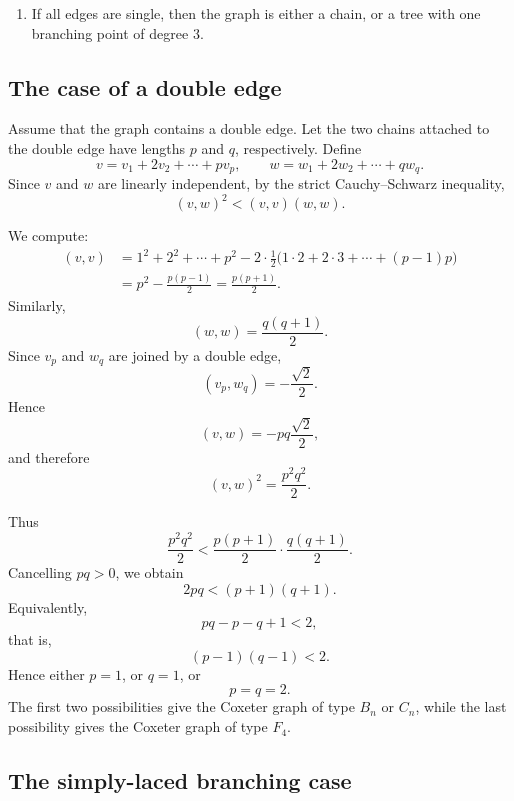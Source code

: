 \begin{enumerate}
\[\begin{tikzpicture}[coxeter]
                  \node at (v1) [below=4pt] {\(v_1\)};
                  \node at (v2) [below=4pt] {\(v_2\)};
                  \node at (vp) [below=4pt] {\(v_p\)};
                  \node at (wq) [below=4pt] {\(w_q\)};
                  \node at (w2) [below=4pt] {\(w_2\)};
                  \node at (w1) [below=4pt] {\(w_1\)};
              \end{tikzpicture}
          \]

    \item If all edges are single, then the graph is either a chain, or a
          tree with one branching point of degree \(3\).
\end{enumerate}

\subsection{The case of a double edge}

Assume that the graph contains a double edge. Let the two chains attached
to the double edge have lengths \(p\) and \(q\), respectively. Define
\[
    v=v_1+2v_2+\cdots+p v_p,
    \qquad
    w=w_1+2w_2+\cdots+q w_q.
\]
Since \(v\) and \(w\) are linearly independent, by the strict Cauchy--Schwarz
inequality,
\[
    (v,w)^2 < (v,v)(w,w).
\]

We compute:
\[
    \begin{aligned}
        (v,v)
         & =
        1^2+2^2+\cdots+p^2
        -
        2\cdot \frac12
        \bigl(1\cdot 2+2\cdot 3+\cdots+(p-1)p\bigr) \\
         & =
        p^2-\frac{p(p-1)}{2}
        =
        \frac{p(p+1)}{2}.
    \end{aligned}
\]
Similarly,
\[
    (w,w)=\frac{q(q+1)}{2}.
\]
Since \(v_p\) and \(w_q\) are joined by a double edge,
\[
    (v_p,w_q)=-\frac{\sqrt{2}}{2}.
\]
Hence
\[
    (v,w)=-pq\frac{\sqrt{2}}{2},
\]
and therefore
\[
    (v,w)^2=\frac{p^2q^2}{2}.
\]

Thus
\[
    \frac{p^2q^2}{2}
    <
    \frac{p(p+1)}{2}\cdot \frac{q(q+1)}{2}.
\]
Cancelling \(pq>0\), we obtain
\[
    2pq < (p+1)(q+1).
\]
Equivalently,
\[
    pq-p-q+1<2,
\]
that is,
\[
    (p-1)(q-1)<2.
\]
Hence either \(p=1\), or \(q=1\), or
\[
    p=q=2.
\]
The first two possibilities give the Coxeter graph of type \(B_n\) or
\(C_n\), while the last possibility gives the Coxeter graph of type \(F_4\).

\subsection{The simply-laced branching case}

